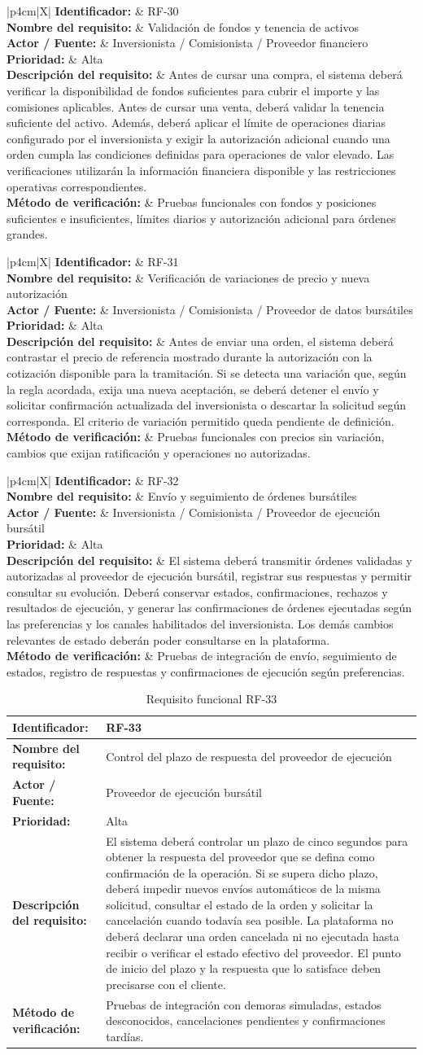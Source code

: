 \documentclass[11pt,a4paper,oneside]{article}
\newcommand{\tablaRequisito}[6]{%
\begin{table}[H]
\centering
\begin{tabularx}{\linewidth}{|p{4cm}|X|}
\hline
\textbf{Identificador:} & #1 \\ \hline
\textbf{Nombre del requisito:} & #2 \\ \hline
\textbf{Actor / Fuente:} & #3 \\ \hline
\textbf{Prioridad:} & #4 \\ \hline
\textbf{Descripción del requisito:} &
#5 \\ \hline
\textbf{Método de verificación:} & #6 \\ \hline
\end{tabularx}
\caption{Requisito funcional #1}
\label{tab:#1}
\end{table}
}
\begin{document}
\tablaRequisito
{RF-30}
{Validación de fondos y tenencia de activos}
{Inversionista / Comisionista / Proveedor financiero}
{Alta}
{Antes de cursar una compra, el sistema deberá verificar la disponibilidad de fondos suficientes para cubrir el importe y las comisiones aplicables. Antes de cursar una venta, deberá validar la tenencia suficiente del activo. Además, deberá aplicar el límite de operaciones diarias configurado por el inversionista y exigir la autorización adicional cuando una orden cumpla las condiciones definidas para operaciones de valor elevado. Las verificaciones utilizarán la información financiera disponible y las restricciones operativas correspondientes.}
{Pruebas funcionales con fondos y posiciones suficientes e insuficientes, límites diarios y autorización adicional para órdenes grandes.}


\tablaRequisito
{RF-31}
{Verificación de variaciones de precio y nueva autorización}
{Inversionista / Comisionista / Proveedor de datos bursátiles}
{Alta}
{Antes de enviar una orden, el sistema deberá contrastar el precio de referencia mostrado durante la autorización con la cotización disponible para la tramitación. Si se detecta una variación que, según la regla acordada, exija una nueva aceptación, se deberá detener el envío y solicitar confirmación actualizada del inversionista o descartar la solicitud según corresponda. El criterio de variación permitido queda pendiente de definición.}
{Pruebas funcionales con precios sin variación, cambios que exijan ratificación y operaciones no autorizadas.}


\tablaRequisito
{RF-32}
{Envío y seguimiento de órdenes bursátiles}
{Inversionista / Comisionista / Proveedor de ejecución bursátil}
{Alta}
{El sistema deberá transmitir órdenes validadas y autorizadas al proveedor de ejecución bursátil, registrar sus respuestas y permitir consultar su evolución. Deberá conservar estados, confirmaciones, rechazos y resultados de ejecución, y generar las confirmaciones de órdenes ejecutadas según las preferencias y los canales habilitados del inversionista. Los demás cambios relevantes de estado deberán poder consultarse en la plataforma.}
{Pruebas de integración de envío, seguimiento de estados, registro de respuestas y confirmaciones de ejecución según preferencias.}


\tablaRequisito
{RF-33}
{Control del plazo de respuesta del proveedor de ejecución}
{Proveedor de ejecución bursátil}
{Alta}
{El sistema deberá controlar un plazo de cinco segundos para obtener la respuesta del proveedor que se defina como confirmación de la operación. Si se supera dicho plazo, deberá impedir nuevos envíos automáticos de la misma solicitud, consultar el estado de la orden y solicitar la cancelación cuando todavía sea posible. La plataforma no deberá declarar una orden cancelada ni no ejecutada hasta recibir o verificar el estado efectivo del proveedor. El punto de inicio del plazo y la respuesta que lo satisface deben precisarse con el cliente.}
{Pruebas de integración con demoras simuladas, estados desconocidos, cancelaciones pendientes y confirmaciones tardías.}
\end{document}

